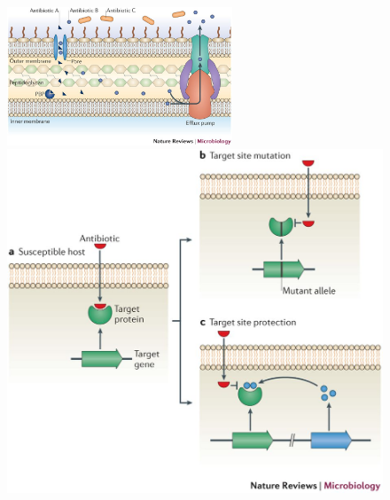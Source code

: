\begin{figure}[h]
\begin{center}
\includegraphics[width = 0.6\textwidth]{1introduction/pics/amr1}
\vspace{0.8cm}
\includegraphics[height = 0.36\textheight]{1introduction/pics/amr3}
\hspace{0.5cm}

\end{center}
\end{figure}
